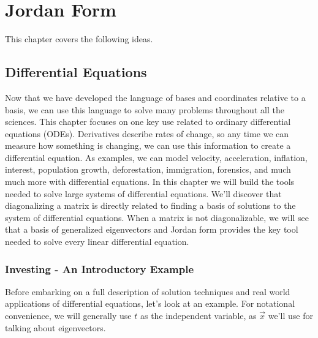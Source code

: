 \chapter{Jordan Form}

This chapter covers the following ideas.






\section{Differential Equations}

Now that we have developed the language of bases and coordinates relative to a basis, we can use this language to solve many problems throughout all the sciences.  
This chapter focuses on one key use related to ordinary differential equations (ODEs).  
Derivatives describe rates of change, so any time we can measure how something is changing, we can use this information to create a differential equation. 
As examples, we can model velocity, acceleration, inflation, interest, population growth, deforestation, immigration, forensics, and much much more with differential equations. 
In this chapter we will build the tools needed to solve large systems of differential equations. 
We'll discover that diagonalizing a matrix is directly related to finding a basis of solutions to the system of differential equations.  
When a matrix is not diagonalizable, we will see that a basis of generalized eigenvectors and Jordan form provides the key tool needed to solve every linear differential equation. 


\subsection{Investing - An Introductory Example}

Before embarking on a full description of solution techniques and real world applications of differential equations, let's look at an example. 
For notational convenience, we will generally use $t$ as the independent variable, as $\vec x$ we'll use for talking about eigenvectors. 

